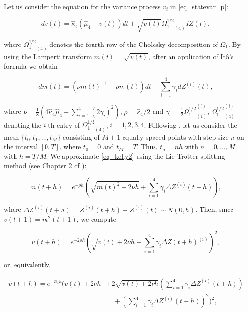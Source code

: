\documentclass{article}
\begin{document}
Let us consider the equation for the variance process $v_t$ in \eqref{eq_statevar_p}:

\begin{equation} \label{eq_kelly1}
    dv (t) = \widehat{\kappa}_4(\widehat{\mu}_4 - v (t) ) dt + \sqrt{v(t)} {\Omega^{1/2}_1}_{(4)} dZ(t),
\end{equation}

\noindent where ${\Omega^{1/2}_1}_{(4)}$ denotes the fourth-row of the Cholesky decomposition of $\Omega_1$. By using the Lamperti transform $m(t) = \sqrt{v(t)}$, after an application of It\^{o}’s formula we obtain

\begin{equation} \label{eq_kelly2}
    d m (t) = (\nu m(t)^{-1} - \rho m(t) )dt + \sum_{i=1}^4 \gamma_i  dZ^{(i)}(t),
\end{equation}

\noindent where $\nu = \frac{1}{8}(4 \widehat{\kappa}_4 \widehat{\mu}_4 - \sum_{i=1}^4 (2\gamma_i)^2 )$, $\rho = \widehat{\kappa}_4/2$ and $\gamma_i = \frac{1}{2} {\Omega^{1/2}_1}_{(4)}^{(i)}$, ${\Omega^{1/2}_1}_{(4)} ^{(i)}$ denoting the $i$-th entry of ${\Omega^{1/2}_1}_{(4)}$, $i=1,2,3,4$. Following \cite{kelly23}, let us consider the mesh $\{t_0,t_1,\ldots,t_M\}$ consisting of 
$M+1$ equally spaced points with step size $h$ on the interval $[0,T]$, where $t_0 = 0$ and $t_M = T$. Thus, $t_n = n h$  with $n=0,\ldots,M$ with $h=T/M$. We approximate \eqref{eq_kelly2} using the Lie-Trotter splitting method (see Chapter 2 of \cite{hairer06}):

\begin{equation*}
    m(t+h) = e^{- \rho h} \left( \sqrt{m(t)^2 + 2 \nu h} + \sum_{i=1}^4 \gamma_i \Delta Z^{(i)}(t+h) \right),
\end{equation*}

\noindent where $\Delta Z^{(i)}(t+h) = Z^{(i)}(t+h) - Z^{(i)}(t) \sim N(0, h)$. Then, since $v(t+1) = m^2(t+1) $, we compute

\begin{equation*}
    v(t+h) = e^{ - 2 \rho h} \left( \sqrt{v(t) + 2 \nu h} + \sum_{i=1}^4 \gamma_i \Delta Z(t+h)^{(i)} \right)^2,
\end{equation*}

\noindent or, equivalently,

\begin{align*}
    v(t+h) = e^{ - \widehat{\kappa}_4 h} \Bigg( v(t) + 2 \nu h 
    &+ 2 \sqrt{v(t) + 2 \nu h} \left( \sum_{i=1}^4 \gamma_i  \Delta Z^{(i)}(t+h) \right)  \\
    &\quad + \left( \sum_{i=1}^4 \gamma_i  \Delta Z^{(i)}(t+h) \right)^2 \Bigg)^2,
\end{align*}
\end{document}
